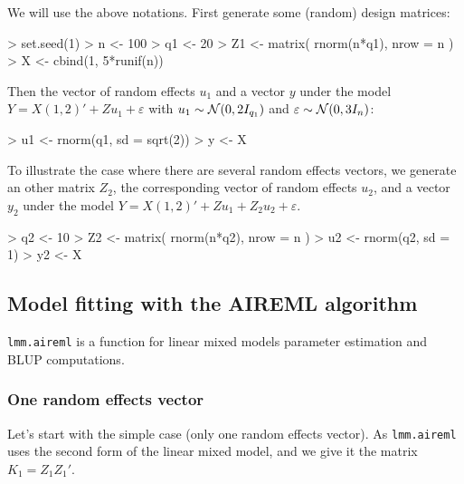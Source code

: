 \documentclass{article}
\renewenvironment{Schunk}{\vspace{\topsep}}{\vspace{\topsep}}
\begin{document}
  We will use the above notations. First generate some (random) design matrices:
 
\begin{Schunk}
\begin{Sinput}
> set.seed(1)
> n <- 100
> q1 <- 20
> Z1 <- matrix( rnorm(n*q1), nrow = n )
> X <- cbind(1, 5*runif(n))
\end{Sinput}
\end{Schunk}
 
  Then the vector of random effects $u_1$ and a vector $y$ under the model $Y = X (1,2)' + Z u_1 + \varepsilon$
  with $u_1 \sim \mathcal{N}(0, 2 I_{q_1})$ and $\varepsilon \sim\mathcal{N}(0, 3 I_n)$:

\begin{Schunk}
\begin{Sinput}
> u1 <- rnorm(q1, sd = sqrt(2))
> y <- X %
\end{Sinput}
\end{Schunk}

  To illustrate the case where there are several random effects vectors, we generate an 
  other matrix $Z_2$, the corresponding vector of random effects $u_2$, and a vector $y_2$ 
  under the model $Y = X (1,2)' + Z u_1 + Z_2 u_2 + \varepsilon$.

\begin{Schunk}
\begin{Sinput}
> q2 <- 10
> Z2 <- matrix( rnorm(n*q2), nrow = n ) 
> u2 <- rnorm(q2, sd = 1)
> y2 <- X %
\end{Sinput}
\end{Schunk}

  \subsection{Model fitting with the AIREML algorithm}

  \verb!lmm.aireml! is a function for linear mixed models parameter estimation
  and BLUP computations. 

  \subsubsection{One random effects vector}
  Let's start with the simple case (only one random effects vector).
  As  \verb!lmm.aireml! uses the second form of the linear mixed model,
  and we give it the matrix $K_1 = Z_1 Z_1'$.
\end{document}
